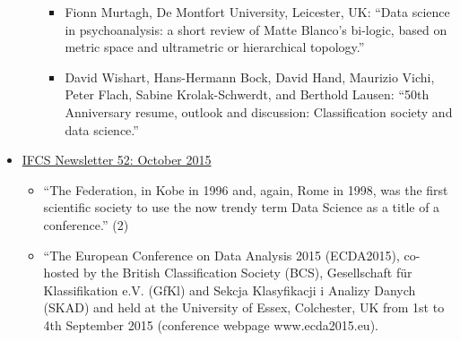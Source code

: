 \documentclass[
  letterpaper,
]{report}
\providecommand{\tightlist}{%
  \setlength{\itemsep}{0pt}\setlength{\parskip}{0pt}}\usepackage{longtable,booktabs,array}
\begin{document}
\begin{itemize}
\begin{itemize}
    \begin{itemize}
    \tightlist
    \item
      Fionn Murtagh, De Montfort University, Leicester, UK: ``Data
      science in psychoanalysis: a short review of Matte Blanco's
      bi-logic, based on metric space and ultrametric or hierarchical
      topology.''
    \item
      David Wishart, Hans-Hermann Bock, David Hand, Maurizio Vichi,
      Peter Flach, Sabine Krolak-Schwerdt, and Berthold Lausen: ``50th
      Anniversary resume, outlook and discussion: Classification society
      and data science.''
    \end{itemize}
  \end{itemize}
\item
  \href{https://ifcs.boku.ac.at/site/lib/exe/fetch.php?media=newsletter_archive:ifcs-newsletter-52.pdf}{IFCS
  Newsletter 52: October 2015}

  \begin{itemize}
  \tightlist
  \item
    ``The Federation, in Kobe in 1996 and, again, Rome in 1998, was the
    first scientific society to use the now trendy term Data Science as
    a title of a conference.'' (2)
  \item
    ``The European Conference on Data Analysis 2015 (ECDA2015),
    co-hosted by the British Classification Society (BCS), Gesellschaft
    für Klassifikation e.V. (GfKl) and Sekcja Klasyfikacji i Analizy
    Danych (SKAD) and held at the University of Essex, Colchester, UK
    from 1st to 4th September 2015 (conference webpage www.ecda2015.eu).


\end{itemize}
\end{itemize}
\end{document}
